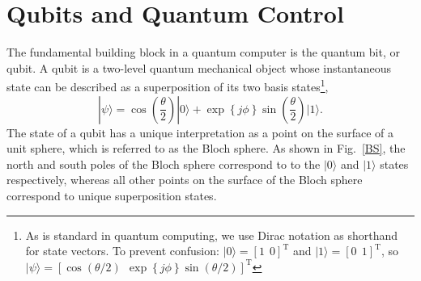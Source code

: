 \documentclass[journal]{IEEEtran}
\begin{document}
\section{Qubits and Quantum Control}


The fundamental building block in a quantum computer is the quantum bit, or qubit. A qubit is a two-level quantum mechanical object whose instantaneous state can be described as a superposition of its two basis states\footnote{As is standard in quantum computing, we use Dirac notation as shorthand for state vectors. To prevent confusion: $|0\rangle=\left[1~~0\right]^\mathrm{T}$ and $|1\rangle=\left[0~~1\right]^\mathrm{T}$, so $|\psi\rangle=\left[\cos\left(\theta/2\right)~~\exp\left\{j\phi\right\}\sin\left(\theta/2\right)\right]^\mathrm{T}$}, 
\begin{equation}
|\psi\rangle=\cos\left(\frac{\theta}{2}\right)|0\rangle+\exp\left\{j\phi\right\}\sin\left(\frac{\theta}{2}\right)|1\rangle.\label{qubitstate}
\end{equation}
The state of a qubit has a unique interpretation as a point on the surface of a unit sphere, which is referred to as the Bloch sphere. As shown in Fig.~\ref{BS}, the north and south poles of the Bloch sphere correspond to to the $|0\rangle$ and $|1\rangle$ states respectively, whereas all other points on the surface of the Bloch sphere correspond to unique superposition states. 
\end{document}
